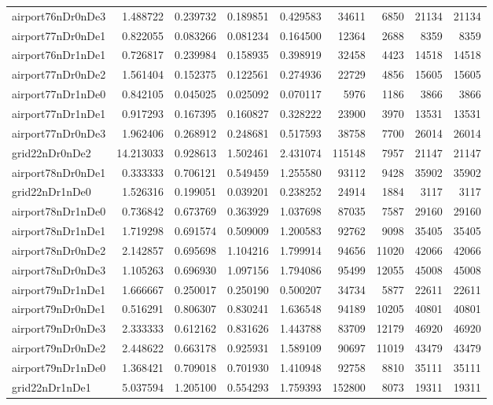 \documentclass[../../../thesis.tex]{subfiles}
\begin{document}
\begin{longtable}{|l|r|r|r|r|r|r|r|r|}
airport76nDr0nDe3 & 1.488722 & 0.239732 & 0.189851 & 0.429583 & 34611 & 6850 & 21134 & 21134 \\
airport77nDr0nDe1 & 0.822055 & 0.083266 & 0.081234 & 0.164500 & 12364 & 2688 & 8359 & 8359 \\
airport76nDr1nDe1 & 0.726817 & 0.239984 & 0.158935 & 0.398919 & 32458 & 4423 & 14518 & 14518 \\
airport77nDr0nDe2 & 1.561404 & 0.152375 & 0.122561 & 0.274936 & 22729 & 4856 & 15605 & 15605 \\
airport77nDr1nDe0 & 0.842105 & 0.045025 & 0.025092 & 0.070117 & 5976 & 1186 & 3866 & 3866 \\
airport77nDr1nDe1 & 0.917293 & 0.167395 & 0.160827 & 0.328222 & 23900 & 3970 & 13531 & 13531 \\
airport77nDr0nDe3 & 1.962406 & 0.268912 & 0.248681 & 0.517593 & 38758 & 7700 & 26014 & 26014 \\
grid22nDr0nDe2 & 14.213033 & 0.928613 & 1.502461 & 2.431074 & 115148 & 7957 & 21147 & 21147 \\
airport78nDr0nDe1 & 0.333333 & 0.706121 & 0.549459 & 1.255580 & 93112 & 9428 & 35902 & 35902 \\
grid22nDr1nDe0 & 1.526316 & 0.199051 & 0.039201 & 0.238252 & 24914 & 1884 & 3117 & 3117 \\
airport78nDr1nDe0 & 0.736842 & 0.673769 & 0.363929 & 1.037698 & 87035 & 7587 & 29160 & 29160 \\
airport78nDr1nDe1 & 1.719298 & 0.691574 & 0.509009 & 1.200583 & 92762 & 9098 & 35405 & 35405 \\
airport78nDr0nDe2 & 2.142857 & 0.695698 & 1.104216 & 1.799914 & 94656 & 11020 & 42066 & 42066 \\
airport78nDr0nDe3 & 1.105263 & 0.696930 & 1.097156 & 1.794086 & 95499 & 12055 & 45008 & 45008 \\
airport79nDr1nDe1 & 1.666667 & 0.250017 & 0.250190 & 0.500207 & 34734 & 5877 & 22611 & 22611 \\
airport79nDr0nDe1 & 0.516291 & 0.806307 & 0.830241 & 1.636548 & 94189 & 10205 & 40801 & 40801 \\
airport79nDr0nDe3 & 2.333333 & 0.612162 & 0.831626 & 1.443788 & 83709 & 12179 & 46920 & 46920 \\
airport79nDr0nDe2 & 2.448622 & 0.663178 & 0.925931 & 1.589109 & 90697 & 11019 & 43479 & 43479 \\
airport79nDr1nDe0 & 1.368421 & 0.709018 & 0.701930 & 1.410948 & 92758 & 8810 & 35111 & 35111 \\
grid22nDr1nDe1 & 5.037594 & 1.205100 & 0.554293 & 1.759393 & 152800 & 8073 & 19311 & 19311 \\

\end{longtable}
\end{document}
